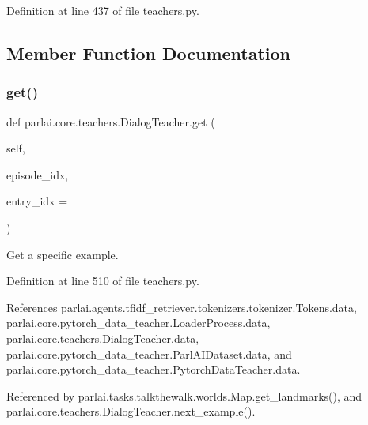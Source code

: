 Definition at line 437 of file teachers.\+py.



\subsection{Member Function Documentation}
\mbox{\label{classparlai_1_1core_1_1teachers_1_1DialogTeacher_a1988d984bf87370e9a9e58c9b8ca67a8}} 
\subsubsection{\texorpdfstring{get()}{get()}}
{\footnotesize\ttfamily def parlai.\+core.\+teachers.\+Dialog\+Teacher.\+get (\begin{DoxyParamCaption}\item[{}]{self,  }\item[{}]{episode\+\_\+idx,  }\item[{}]{entry\+\_\+idx = {} }\end{DoxyParamCaption})}

\begin{DoxyVerb}Get a specific example.\end{DoxyVerb}
 

Definition at line 510 of file teachers.\+py.



References parlai.\+agents.\+tfidf\+\_\+retriever.\+tokenizers.\+tokenizer.\+Tokens.\+data, parlai.\+core.\+pytorch\+\_\+data\+\_\+teacher.\+Loader\+Process.\+data, parlai.\+core.\+teachers.\+Dialog\+Teacher.\+data, parlai.\+core.\+pytorch\+\_\+data\+\_\+teacher.\+Parl\+A\+I\+Dataset.\+data, and parlai.\+core.\+pytorch\+\_\+data\+\_\+teacher.\+Pytorch\+Data\+Teacher.\+data.



Referenced by parlai.\+tasks.\+talkthewalk.\+worlds.\+Map.\+get\+\_\+landmarks(), and parlai.\+core.\+teachers.\+Dialog\+Teacher.\+next\+\_\+example().

